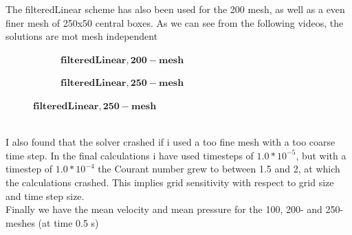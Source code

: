 \documentclass[a4paper,english,11pt,twoside]{article}
\begin{document}
The filteredLinear scheme has also been used for the 200 mesh, as well as a even finer mesh of 250x50 central boxes. As we can see from the following videos, the solutions are mot mesh independent\\
\begin{figure}[h!]
	\begin{subfigure}{0.5\textwidth}
		\caption{$\mathbf{filteredLinear, 200-mesh}$}
 	\end{subfigure}
	\begin{subfigure}{0.5\textwidth}
		\caption{$\mathbf{filteredLinear, 250-mesh}$}
 	\end{subfigure}
\end{figure}
\\
I also found that the solver crashed if i used a too fine mesh with a too coarse time step. In the final calculations i have used timesteps of $1.0*10^{-5}$, but with a timestep of $1.0*10^{-4}$ the Courant number grew to between 1.5 and 2, at which the calculations crashed. This implies grid sensitivity with respect to grid size and time step size.\\
\newpage
Finally we have the mean velocity and mean pressure for the 100, 200- and 250-meshes (at time 0.5 s)\\
\end{document}
